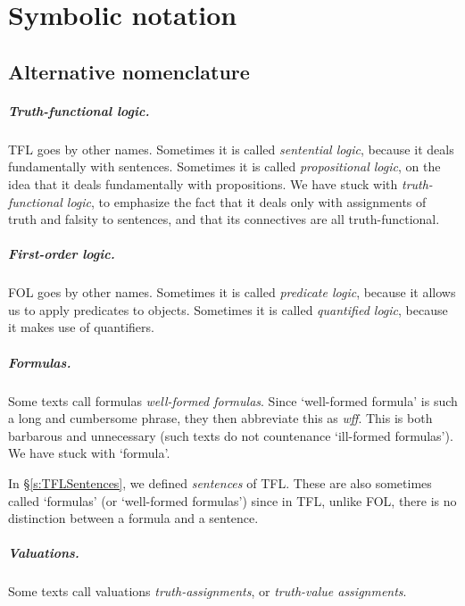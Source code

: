 
\chapter{Symbolic notation}
\label{app.notation}

\section{Alternative nomenclature}

\paragraph{Truth-functional logic.} TFL goes by other names. Sometimes it is called \emph{sentential logic}, because it deals fundamentally with sentences. Sometimes it is called \emph{propositional logic}, on the idea that it deals fundamentally with propositions. We have stuck with \emph{truth-functional logic}, to emphasize the fact that it deals only with assignments of truth and falsity to sentences, and that its connectives are all truth-functional.

\paragraph{First-order logic.} FOL goes by other names. Sometimes it is called \emph{predicate logic}, because it allows us to apply  predicates to objects. Sometimes it is called \emph{quantified logic}, because it makes use of quantifiers.

\paragraph{Formulas.} Some texts call formulas \emph{well-formed formulas}. Since `well-formed formula' is such a long and cumbersome phrase, they then abbreviate this as \emph{wff}. This is both barbarous and unnecessary (such texts do not countenance `ill-formed formulas'). We have stuck with `formula'.

In \S\ref{s:TFLSentences}, we defined \emph{sentences} of TFL. These are also sometimes called `formulas' (or `well-formed formulas') since in TFL, unlike FOL, there is no distinction between a formula and a sentence.

\paragraph{Valuations.} Some texts call valuations \emph{truth-assignments}, or \emph{truth-value assignments}.

